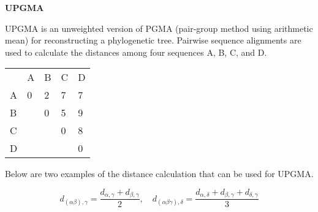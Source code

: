 \question \textbf{UPGMA}

UPGMA is an unweighted version of PGMA (pair-group method using arithmetic mean) for reconstructing a phylogenetic tree. Pairwise sequence alignments are used to calculate the distances among four sequences A, B, C, and D.

\begin{table}[H]
\centering
\begin{tabular}{lllll}
                       & A                      & B                      & C                      & D                      \\ \cline{2-5} 
\multicolumn{1}{l|}{A} & \multicolumn{1}{l|}{0} & \multicolumn{1}{l|}{2} & \multicolumn{1}{l|}{7} & \multicolumn{1}{l|}{7} \\ \cline{2-5} 
B                      & \multicolumn{1}{l|}{}  & \multicolumn{1}{l|}{0} & \multicolumn{1}{l|}{5} & \multicolumn{1}{l|}{9} \\ \cline{3-5} 
C                      &                        & \multicolumn{1}{l|}{}  & \multicolumn{1}{l|}{0} & \multicolumn{1}{l|}{8} \\ \cline{4-5} 
D                      &                        &                        & \multicolumn{1}{l|}{}  & \multicolumn{1}{l|}{0} \\ \cline{5-5} 
\end{tabular}
\end{table}

Below are two examples of the distance calculation that can be used for UPGMA.

\[
d_{(\alpha\beta),\gamma}=\dfrac{d_{\alpha,\gamma} + d_{\beta,\gamma}}{2}, \quad d_{(\alpha\beta\gamma),\delta}=\dfrac{d_{\alpha,\delta} + d_{\beta,\gamma} + d_{\delta,\gamma}}{3}
\]

